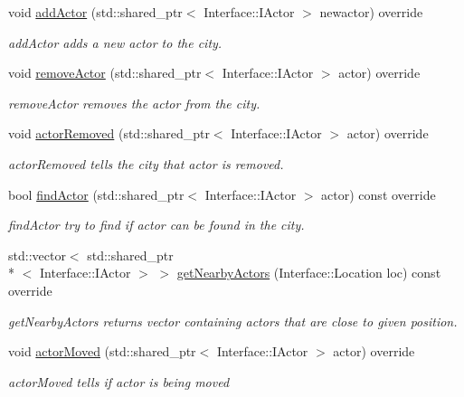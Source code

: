 \begin{DoxyCompactItemize}
void \hyperlink{class_student_side_1_1_city_af3c2bc7c60238c935c42b66e6f8d257a}{add\-Actor} (std\-::shared\-\_\-ptr$<$ Interface\-::\-I\-Actor $>$ newactor) override
\begin{DoxyCompactList}\small\item\em add\-Actor adds a new actor to the city. \end{DoxyCompactList}\item 
void \hyperlink{class_student_side_1_1_city_ae3065589fed9daf61c01978e013bdd13}{remove\-Actor} (std\-::shared\-\_\-ptr$<$ Interface\-::\-I\-Actor $>$ actor) override
\begin{DoxyCompactList}\small\item\em remove\-Actor removes the actor from the city. \end{DoxyCompactList}\item 
void \hyperlink{class_student_side_1_1_city_aa4b2cda0950f77412551403669cafd00}{actor\-Removed} (std\-::shared\-\_\-ptr$<$ Interface\-::\-I\-Actor $>$ actor) override
\begin{DoxyCompactList}\small\item\em actor\-Removed tells the city that actor is removed. \end{DoxyCompactList}\item 
bool \hyperlink{class_student_side_1_1_city_aee72420052d9af04957551474c1f7af9}{find\-Actor} (std\-::shared\-\_\-ptr$<$ Interface\-::\-I\-Actor $>$ actor) const override
\begin{DoxyCompactList}\small\item\em find\-Actor try to find if actor can be found in the city. \end{DoxyCompactList}\item 
std\-::vector$<$ std\-::shared\-\_\-ptr\\*
$<$ Interface\-::\-I\-Actor $>$ $>$ \hyperlink{class_student_side_1_1_city_a2285ee28fb606dd774b8e60979d6e820}{get\-Nearby\-Actors} (Interface\-::\-Location loc) const override
\begin{DoxyCompactList}\small\item\em get\-Nearby\-Actors returns vector containing actors that are close to given position. \end{DoxyCompactList}\item 
void \hyperlink{class_student_side_1_1_city_ae74783e6701ceb40dd9efbd3faf3e1c3}{actor\-Moved} (std\-::shared\-\_\-ptr$<$ Interface\-::\-I\-Actor $>$ actor) override
\begin{DoxyCompactList}\small\item\em actor\-Moved tells if actor is being moved \end{DoxyCompactList}\item 

\end{DoxyCompactItemize}
